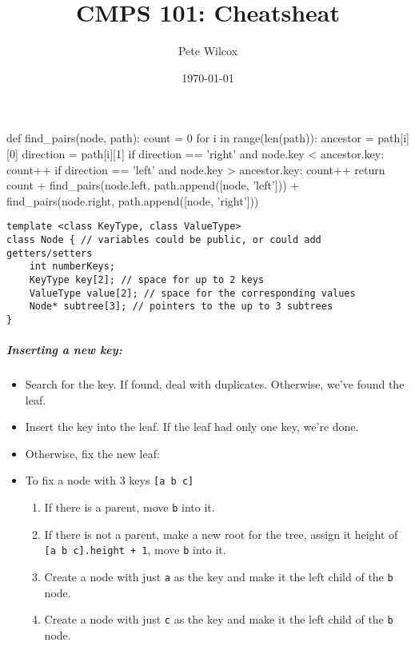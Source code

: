 \documentclass{article}
\title{CMPS 101: Cheatsheat}
\author{Pete Wilcox}
\date\today
\newcommand{\code}[1]{\texttt{#1}}
\begin{document}
\begin{python}
    def find_pairs(node, path):
    count = 0
    for i in range(len(path)):
        ancestor = path[i][0]
        direction = path[i][1]
        if direction == 'right' and node.key < ancestor.key:
            count++
        if direction == 'left' and node.key > ancestor.key:
            count++
    return count + find_pairs(node.left, path.append([node, 'left'])) + 
        find_pairs(node.right, path.append([node, 'right']))
\end{python}

\begin{lstlisting}[frame=single,basicstyle=\footnotesize\ttfamily]
template <class KeyType, class ValueType>
class Node { // variables could be public, or could add getters/setters
    int numberKeys;
    KeyType key[2]; // space for up to 2 keys
    ValueType value[2]; // space for the corresponding values
    Node* subtree[3]; // pointers to the up to 3 subtrees
}
\end{lstlisting}

\subparagraph*{Inserting a new key:}
\begin{itemize}[noitemsep]
    \item Search for the key. If found, deal with duplicates. Otherwise, we've found the leaf.
    \item Insert the key into the leaf. If the leaf had only one key, we're done.
    \item Otherwise, fix the new leaf:
    \item To fix a node with 3 keys \code{[a b c]} 
    \begin{enumerate}[noitemsep]
        \item If there is a parent, move \code{b} into it.
        \item If there is not a parent, make a new root for the tree, assign it height of \code{[a b c].height + 1}, move \code{b} into it.
        \item Create a node with just \code{a} as the key and make it the left child of the \code{b} node.
        \item Create a node with just \code{c} as the key and make it the left child of the \code{b} node.
    \end{enumerate}
\end{itemize}
\end{document}
